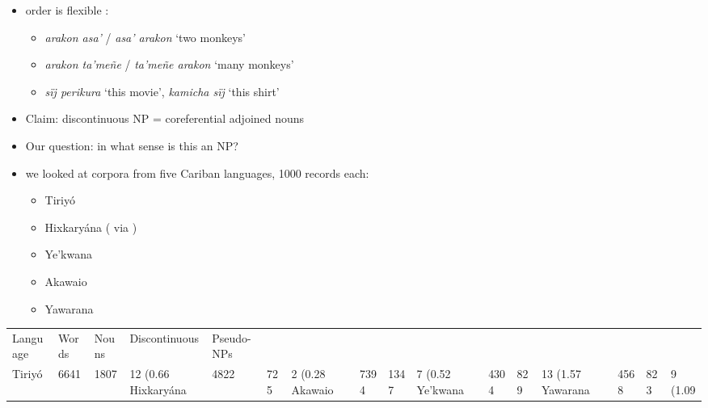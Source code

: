 \documentclass[10pt]{article}
\begin{document}
\begin{itemize}
\tightlist
\item
  order is flexible \parencites[128]{payne1993nonconfigurationality}:

  \begin{itemize}
  \tightlist
  \item
    \emph{arakon asa'} / \emph{asa' arakon} `two monkeys'
  \item
    \emph{arakon ta'meñe} / \emph{ta'meñe arakon} `many monkeys'
  \item
    \emph{sïj perikura} `this movie', \emph{kamicha sïj} `this shirt'
  \end{itemize}
\item
  Claim: discontinuous NP = coreferential adjoined nouns 
\item
  Our question: in what sense is this an NP? 
\item
  we looked at corpora from five Cariban languages, 1000 records each:

  \begin{itemize}
  \tightlist
  \item
    Tiriyó \parencites{meiraDBtrio}
  \item
    Hixkaryána (\textcites{derbyshire1965textos} via
    \textcites{meiraDBhixka})
  \item
    Ye'kwana \parencites{caceresDByekwana}
  \item
    Akawaio \parencites{caesarDBakawaio}
  \item
    Yawarana \parencites{caceres2020flex}
  \end{itemize}
\end{itemize}\begin{tabular}[t]{lllll}

  Language & Words & Nouns & Discontinuous & Pseudo-NPs \\

    Tiriyó &  6641 &  1807 &    12 (0.66%
Hixkaryána &  4822 &   725 &     2 (0.28%
   Akawaio &  7394 &  1347 &     7 (0.52%
  Ye'kwana &  4304 &   829 &    13 (1.57%
  Yawarana &  4568 &   823 &     9 (1.09%

\end{tabular}
\end{document}
